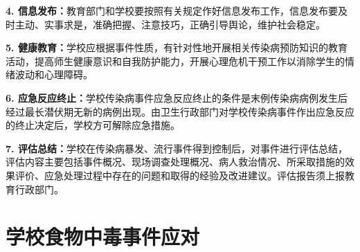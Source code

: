\begin{keybox}
\textbf{4. 信息发布：}教育部门和学校要按照有关规定作好信息发布工作，信息发布要及时主动、实事求是，准确把握、注意技巧，正确引导舆论，维护社会稳定。

\textbf{5. 健康教育：}学校应根据事件性质，有针对性地开展相关传染病预防知识的教育活动，提高师生健康意识和自我防护能力，开展心理危机干预工作以消除学生的情绪波动和心理障碍。

\textbf{6. 应急反应终止：}学校传染病事件应急反应终止的条件是末例传染病病例发生后经过最长潜伏期无新的病例出现。由卫生行政部门对学校传染病事件作出应急反应的终止决定后，学校方可解除应急措施。

\textbf{7. 评估总结：}学校在传染病暴发、流行事件得到控制后，对事件进行评估总结，评估内容主要包括事件概况、现场调查处理概况、病人救治情况、所采取措施的效果评价、应急处理过程中存在的问题和取得的经验及改进建议。评估报告须上报教育行政部门。
\end{keybox}

\section{学校食物中毒事件应对}

